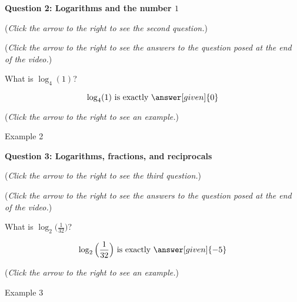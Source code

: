 \documentclass{ximera}
\begin{document}
\textbf{Question 2: Logarithms and the number $1$}
\begin{question}
\begin{flushright}
{\color{blue}(\emph{Click the arrow to the right to see the second question.})}
\end{flushright}
\begin{center}
\begin{expandable}
{\color{blue}(\emph{Click the arrow to the right to see the answers 
to the question posed at the end of the video.})}
\begin{expandable}
What is $\log_4(1)$?
\begin{prompt}
\[
\log_4(1) \text{ is exactly }\answer[given]{0}
\]
\end{prompt}
\begin{flushright}
{\color{blue}(\emph{Click the arrow to the right to see an example.})}
\end{flushright}
\begin{expandable}
Example 2
\end{expandable}
\end{expandable}
\end{expandable}
\end{center}
\end{question}


\textbf{Question 3: Logarithms, fractions, and reciprocals}
\begin{question}
\begin{flushright}
{\color{blue}(\emph{Click the arrow to the right to see the third question.})}
\end{flushright}
\begin{center}
\begin{expandable}
{\color{blue}(\emph{Click the arrow to the right to see the answers 
to the question posed at the end of the video.})}
\begin{expandable}
What is $\log_2\Big(\frac{1}{32}\Big)$?
\begin{prompt}
\[
\log_2\Big(\frac{1}{32} \Big) \text{ is exactly }\answer[given]{-5}
\]
\end{prompt}
\begin{flushright}
{\color{blue}(\emph{Click the arrow to the right to see an example.})}
\end{flushright}
\begin{expandable}
Example 3
\end{expandable}
\end{expandable}
\end{expandable}
\end{center}
\end{question}
\end{document}
